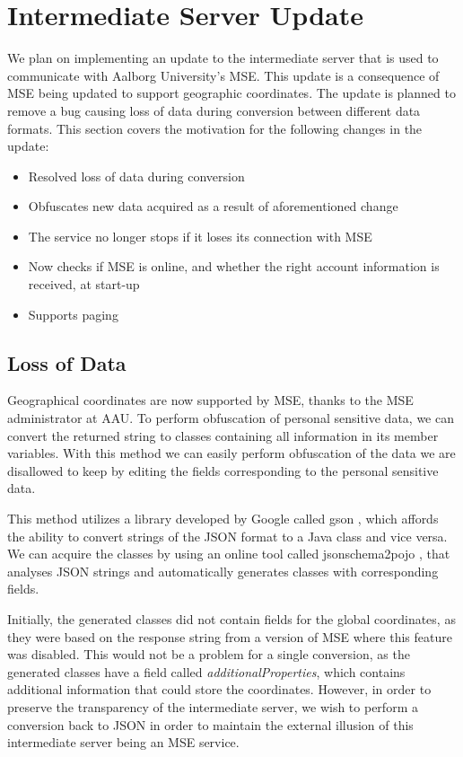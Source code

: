 \section{Intermediate Server Update}\label{sec:proxy_update1}
We plan on implementing an update to the intermediate server that is used to communicate with Aalborg University's MSE. This update is a consequence of MSE being updated to support geographic coordinates. The update is planned to remove a bug causing loss of data during conversion between different data formats. This section covers the motivation for the following changes in the update:

\begin{itemize}
\item Resolved loss of data during conversion
\item Obfuscates new data acquired as a result of aforementioned change
\item The service no longer stops if it loses its connection with MSE
\item Now checks if MSE is online, and whether the right account information is received, at start-up
\item Supports paging
\end{itemize}

\subsection{Loss of Data}
Geographical coordinates are now supported by MSE, thanks to the MSE administrator at AAU. To perform obfuscation of personal sensitive data, we can convert the returned string to classes containing all information in its member variables. With this method we can easily perform obfuscation of the data we are disallowed to keep by editing the fields corresponding to the personal sensitive data.

This method utilizes a library developed by Google called gson \cite{gson}, which affords the ability to convert strings of the JSON format to a Java class and vice versa. We can acquire the classes by using an online tool called jsonschema2pojo \cite{jsonschematwopojo}, that analyses JSON strings and automatically generates classes with corresponding fields.

Initially, the generated classes did not contain fields for the global coordinates, as they were based on the response string from a version of MSE where this feature was disabled. This would not be a problem for a single conversion, as the generated classes have a field called \textit{additionalProperties}, which contains additional information that could store the coordinates. However, in order to preserve the transparency of the intermediate server, we wish to perform a conversion back to JSON in order to maintain the external illusion of this intermediate server being an MSE service.

